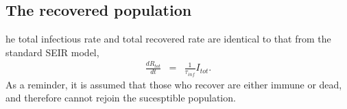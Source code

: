 \documentclass[notitlepage, superscriptaddress]{revtex4-2}
\begin{document}
\subsection{The recovered population}

he total infectious rate and total recovered rate are identical to that from the standard SEIR model,
\begin{eqnarray}
\label{E:dRtot}
%
\frac{dR_{tot}}{dt} &=& \frac{1}{\tau_{inf}}I_{tot}.
\end{eqnarray}
As a reminder, it is assumed that those who recover are either immune or dead, and therefore cannot rejoin the sucesptible population. 

% 
\end{document}
